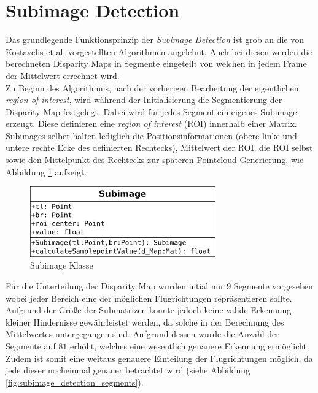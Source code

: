 \section{Subimage Detection}
\label{sec:mean_disparity_detection}

Das grundlegende Funktionsprinzip der \emph{Subimage Detection} ist grob an die von Kostavelis et al. vorgestellten Algorithmen angelehnt. Auch bei diesen werden die berechneten Disparity Maps in Segmente eingeteilt von welchen in jedem Frame der Mittelwert errechnet wird.\\

\noindent
Zu Beginn des Algorithmus, nach der vorherigen Bearbeitung der eigentlichen \emph{region of interest}, wird während der Initialisierung die Segmentierung der Disparity Map festgelegt. Dabei wird für jedes Segment ein eigenes Subimage erzeugt. Diese definieren eine \emph{region of interest} (ROI) innerhalb einer Matrix. Subimages selber halten lediglich die Positionsinformationen (obere linke und untere rechte Ecke des definierten Rechtecks), Mittelwert der ROI, die ROI selbst sowie den Mittelpunkt des Rechtecks zur späteren Pointcloud Generierung, wie Abbildung \ref{fig:subimage_class} aufzeigt.

\begin{figure}[h]
	\begin{center}
		\includegraphics[width=8cm]{img/subimage_class.pdf}
	\end{center}
	\caption{Subimage Klasse}
	\label{fig:subimage_class}
\end{figure}

\noindent
Für die Unterteilung der Disparity Map wurden intial nur $9$ Segmente vorgesehen wobei jeder Bereich eine der möglichen Flugrichtungen repräsentieren sollte. Aufgrund der Größe der Submatrizen konnte jedoch keine valide Erkennung kleiner Hindernisse gewährleistet werden, da solche in der Berechnung des Mittelwertes untergegangen sind. Aufgrund dessen wurde die Anzahl der Segmente auf $81$ erhöht, welches eine wesentlich genauere Erkennung ermöglicht. Zudem ist somit eine weitaus genauere Einteilung der Flugrichtungen möglich, da jede dieser nocheinmal genauer betrachtet wird (siehe Abbildung \ref{fig:subimage_detection_segments}).

